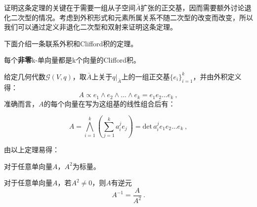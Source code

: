 证明这条定理的关键在于需要一组从子空间$\bar A$扩张的正交基，因而需要额外讨论退化二次型的情况。考虑到外积形式和元素所属关系不随二次型的改变而改变，所以我们可以通过定义非退化二次型和双射来证明这条定理。

下面介绍一条联系外积和Clifford积的定理。
\begin{theorem}{}
每个\textbf{非零}k-单向量都是k个向量的Clifford积。
\end{theorem}
给定几何代数$\mathcal G(V,q)$，取$\bar A$上关于$q|_{\bar A}$上的一组正交基$\{e_i\}^k_{i=1}$，并由外积定义得：
\begin{equation}
A\propto e_1\wedge e_2\wedge...\wedge e_k=e_1e_2...e_k~,
\end{equation}
准确而言，$A$的每个向量在写为这组基的线性组合后有：

\begin{equation}
A=\bigwedge ^k_{i=1}\left(\sum^k_{j=1}a^j_ie_j\right)=\mathrm{det}\,a^j_ie_1 e_2...e_k~,
\end{equation}

由以上定理易得：
\begin{corollary}{}
对于任意单向量$A$，$A^2$为标量。
\end{corollary}
\begin{corollary}{}
对于任意单向量$A$，若$A^2\neq 0$，则$A$有逆元
\begin{equation}
A^{-1}=\frac{A}{A^2}~.
\end{equation}
\end{corollary}